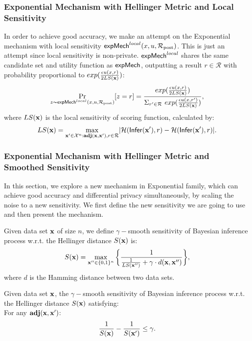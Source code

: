 \documentclass{article}
\begin{document}
\subsubsection{Exponential Mechanism with Hellinger Metric and Local Sensitivity}
\label{subsec_emls}
In order to achieve good accuracy, we make an attempt on the Exponential mechanism with local sensitivity $\mathsf{expMech}^{local}(x,u,\mathcal{R}_{\textup{post}})$. This is just an attempt since local sensitivity is non-private. $\mathsf{expMech}^{local}$ shares the same candidate set and utility function as $\mathsf{expMech}$, outputting a result $r \in \mathcal{R}$ with probability proportional to $exp(\frac{\epsilon u(x,r)}{2 LS(\textbf{x})})$:
\[
\underset{z \thicksim \mathsf{expMech}^{local}(x,u,\mathcal{R}_{\textup{post}})}{\Pr}[z=r] = \frac
{exp(\frac{\epsilon u(x,r)}{2 LS(\textbf{x})})}
{\Sigma_{r' \in \mathcal{R}}\ exp(\frac{\epsilon u(x,r')}{2 LS(\textbf{x})})},
\]
where $LS(\textbf{x})$ is the local sensitivity of scoring function, calculated by:
\begin{equation*}
LS(\textbf{x})=\max_{\textbf{x}' \in \mathcal{X}^n: \\ \textbf{adj}(\textbf{x},\textbf{x}'), r\in \mathcal{R}}\lvert \mathcal{H}(\mathsf{Infer}(\textbf{x}'), r) - \mathcal{H}(\mathsf{Infer}(\textbf{x}'), r)\rvert.
\end{equation*}


\subsubsection{Exponential Mechanism with Hellinger Metric and Smoothed Sensitivity}
\label{subsec_hexpmech}
In this section, we explore a new mechanism in Exponential family, which can achieve good accuracy and differential privacy simultaneously, by scaling the noise to a new sensitivity. We first define the new sensitivity we are going to use and then present the mechanism.
\begin{definition}
\label{def_gamma_smooth}
Given data set $\textbf{x}$ of size $n$, we define $\gamma -$smooth sensitivity of Bayesian inference process w.r.t. the Hellinger distance $S(\textbf{x})$ is:
\begin{equation}
  \label{eq_smooth}
   S(\textbf{x})=\max_{\textbf{x}'' \in \{0,1\}^{n}}\bigg \{ \frac{1}{\frac{1}{LS(\textbf{x}'')} +\gamma \cdot d(\textbf{x},\textbf{x}'')} \bigg \},
\end{equation}
where $d$ is the Hamming distance between two data sets.
\end{definition}

\begin{thm}
\label{thm_gamma_smooth}
Given data set $\textbf{x}$, the $\gamma -$smooth sensitivity of Bayesian inference process w.r.t. the Hellinger distance $S(\textbf{x})$ satisfying:\\
For any $\textbf{adj}(\textbf{x},\textbf{x}')$:
\begin{equation}
\label{eq_gamma_smooth}
\frac{1}{S(\textbf{x})} - \frac{1}{S(\textbf{x}')} \leq \gamma.
\end{equation}

\end{thm}
\end{document}
